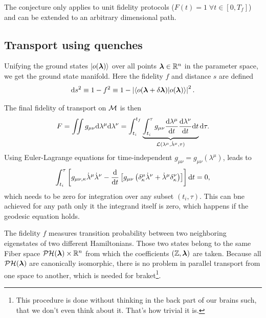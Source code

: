 The conjecture only applies to  unit fidelity protocols ($F(t)=1 \;\forall t\in[0,T_f]$) and can be extended to an arbitrary dimensional path.








\subsection{Transport using quenches}
\label{sec:quenches}
Unifying the ground states $\ket{o({\bm\lambda})}$ over all points ${\bm\lambda}\in\mathbb{R}^n$ in the parameter space, we get the ground state manifold. Here the fidelity $f$ and distance $s$ are defined
\begin{equation}
    \mathrm{d} s^2 \equiv 1-f^2\equiv 1-\left|\braket{o(\bm{{\bm\lambda}}+\delta\bm{{\bm\lambda}})|o(\bm{{\bm\lambda}})}\right|^2.
    \label{eq:distanceOnM0_1}
\end{equation}

The final fidelity of transport on $\mathcal{M}$ is then
\begin{equation}
    F=\iint g_{\mu\nu}\mathrm{d}\lambda^\mu\mathrm{d}\lambda^\nu = \int_{t_i}^{t_f}\underbrace{\int_{t_i}^\tau g_{\mu\nu}\frac{\mathrm{d} \lambda^\mu}{\mathrm{d} t}\frac{\mathrm{d} \lambda^\nu}{\mathrm{d} t} \mathrm{d} t}_{\mathcal{L}(\lambda^\mu,\dot\lambda^\mu,\tau)}\mathrm{d} \tau .
\end{equation}
Using Euler-Lagrange equations for time-independent $g_{\mu\nu}=g_{\mu\nu}(\lambda^\mu)$, leads to
\begin{equation}
    \int_{t_i}^{\tau}\left[g_{\mu\nu,\kappa}\dot\lambda^\mu\dot\lambda^\nu - \frac{\mathrm{d} }{\mathrm{d} t}\left[g_{\mu\nu}\left(\delta^\mu_\kappa\dot\lambda^\nu+\dot\lambda^\mu\delta^\nu_\kappa\right)\right]\right]\mathrm{d} t=0,
\end{equation}
which needs to be zero for integration over any subset $(t_i,\tau)$. This can bne achieved for any path only it the integrand itself is zero, which happens if the geodesic equation holds.

The fidelity $f$ measures transition probability between two neighboring eigenstates of two different Hamiltonians. Those two states belong to the same Fiber space $\mathcal{PH}({\bm\lambda})\times \mathbb{R}^n$ from which the coefficients $(\mathbb{Z},{\bm\lambda})$ are taken. Because all $\mathcal{PH}({\bm\lambda})$ are canonically isomorphic, there is no problem in parallel transport from one space to another, which is needed for braket\footnote{This procedure is done without thinking in the back part of our brains such, that we don't even think about it. That's how trivial it is.}.

